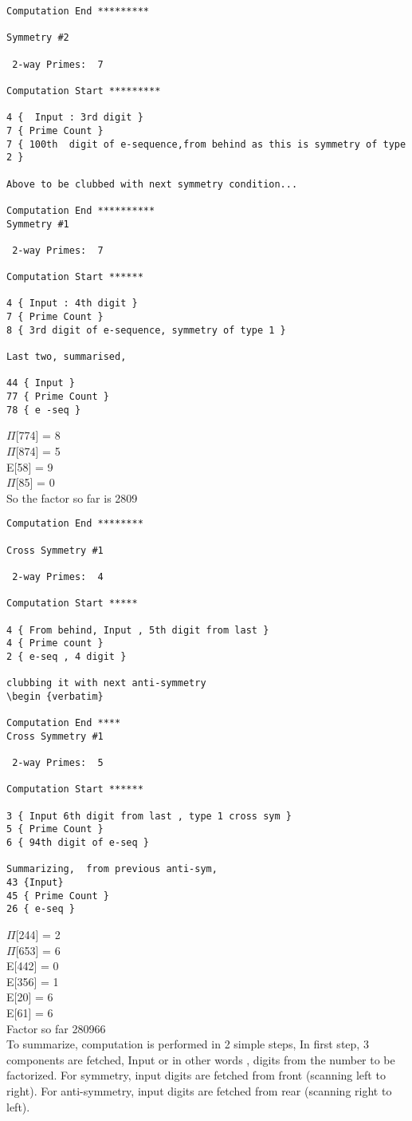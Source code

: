 \begin{verbatim}
Computation End *********

Symmetry #2

 2-way Primes: 	7

Computation Start *********

4 {  Input : 3rd digit }
7 { Prime Count }
7 { 100th  digit of e-sequence,from behind as this is symmetry of type 2 }

Above to be clubbed with next symmetry condition...

Computation End **********
Symmetry #1

 2-way Primes: 	7

Computation Start ******

4 { Input : 4th digit }
7 { Prime Count }
8 { 3rd digit of e-sequence, symmetry of type 1 }

Last two, summarised,

44 { Input }
77 { Prime Count }
78 { e -seq }
\end {verbatim}
$\Pi$[774] = 8 \\ 
$\Pi$[874] = 5 \\
E[58] = 9\\
$\Pi$[85] = 0\\
So the factor so far is { 2809 }

\begin{verbatim}
Computation End ********

Cross Symmetry #1

 2-way Primes: 	4

Computation Start *****

4 { From behind, Input , 5th digit from last }
4 { Prime count }
2 { e-seq , 4 digit }

clubbing it with next anti-symmetry
\begin {verbatim}

Computation End ****
Cross Symmetry #1

 2-way Primes: 	5

Computation Start ******

3 { Input 6th digit from last , type 1 cross sym }
5 { Prime Count }
6 { 94th digit of e-seq }

Summarizing,  from previous anti-sym,
43 {Input}
45 { Prime Count }
26 { e-seq }
\end{verbatim}
$\Pi$[244] = 2 \\
$\Pi$[653] = 6 \\
E[442] = 0 \\
E[356] = 1 \\
E[20] = 6 \\
E[61] = 6 \\
Factor so far { 280966 } \\
To summarize, 
computation is performed in 2 simple steps,
In first step, 3 components are fetched,
Input or in other words , digits from the number to be factorized.
For symmetry, input digits are fetched from front (scanning left to right).
For anti-symmetry, input digits are fetched from rear (scanning right to left).


